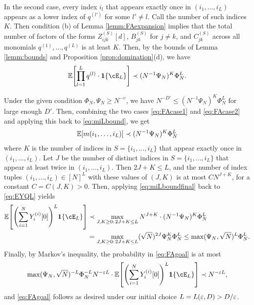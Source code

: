\begin{proof-of-lemma}[\ref{lemma:fluctuationavg}]
In the second case,
every index $i_l$ that appears exactly once in $(i_1,\ldots,i_L)$ appears
as a lower index of $q^{(l')}$ for some $l' \neq l$. Call the number
of such indices $K$. Then condition (b) of Lemma \ref{lemm:FAexpansion} implies
that the total number of factors of the forms
$Z_{ijk}^{(S)}[d]$, $B_{jk}^{(S)}$ for $j \neq k$, and $C_{jk}^{(S)}$
across all monomials $q^{(1)},\ldots,q^{(L)}$ is at least $K$. Then, 
by the bounds of Lemma \ref{lemm:bounds} and
Proposition \ref{prop:domination}(d), we have
\begin{equation}\label{eq:FAcase2}
\E\left[\prod_{l=1}^L q^{(l)} \cdot \bI\{\cE_L\}\right]
\prec (N^{-1}\Psi_N)^K\Phi_N^L.
\end{equation}

Under the given condition $\Phi_N,\Psi_N \geq N^{-\upsilon}$, we have
$N^{-D'} \leq (N^{-1}\Psi_N)^K\Phi_N^L$ for large enough $D'$. Then,
combining the two cases \eqref{eq:FAcase1} and \eqref{eq:FAcase2} and applying
this back to \eqref{eq:miLbound}, we get
\begin{equation}\label{eq:miLboundfinal}
\mathbb{E}[m(i_1,\ldots,i_L)] \prec (N^{-1}\Psi_N)^K\Phi_N^L
\end{equation}
where $K$ is the number of indices in $S=\{i_1,\ldots,i_L\}$ that appear exactly
once in $(i_1,\ldots,i_L)$.
Let $J$ be the number of distinct indices in $S=\{i_1,\ldots,i_L\}$ that appear
at least twice in $(i_1,\ldots,i_L)$. Then $2J+K \leq L$, and the number of
index tuples $(i_1,\ldots,i_L) \in [N]^L$ with these values of $(J,K)$ is at
most $CN^{J+K}$, for a constant $C=C(J,K)>0$. Then,
applying \eqref{eq:miLboundfinal} back to \eqref{eq:EYQL} yields
\begin{align*}
\E\left[\left(\sum_{i=1}^{N} Y_i^{(i)}[0]\right)^L
\bI\{\cE_L\}\right] &\prec \max_{J,K \geq 0:\,2J+K \leq L}
N^{J+K} \cdot (N^{-1}\Psi_N)^K\Phi_N^L\\
&=\max_{J,K \geq 0:\,2J+K \leq L}
(\sqrt{N})^{2J}\Psi_N^K\Phi_N^L \leq \max(\Psi_N,\sqrt{N})^L \Phi_N^L.
\end{align*}
Finally, by Markov's inequality, the probability in \eqref{eq:FAgoal} is at most
\begin{align*}
\max(\Psi_N,\sqrt{N})^{-L}\Phi_N^{-L}N^{-\eps L}
\cdot \E\left[\left(\sum_{i=1}^{N} Y_i^{(i)}[0]\right)^L
\bI\{\cE_L\}\right] \prec N^{-\eps L},
\end{align*}
and \eqref{eq:FAgoal} follows as desired under our initial
choice $L=L(\varepsilon,D)>D/\varepsilon$.
\end{proof-of-lemma}

